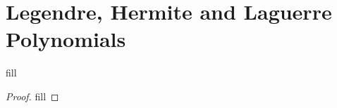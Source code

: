 \section{Legendre, Hermite and Laguerre Polynomials}

\begin{exercise}{1}
fill
\end{exercise}
\begin{proof}
fill
\end{proof}